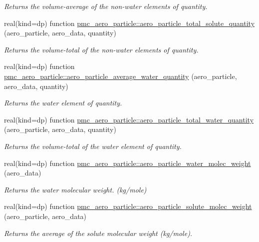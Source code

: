 \begin{DoxyCompactItemize}
\begin{DoxyCompactList}\small\item\em Returns the volume-\/average of the non-\/water elements of quantity. \end{DoxyCompactList}\item 
real(kind=dp) function \mbox{\hyperlink{namespacepmc__aero__particle_a203722f122db295d8077019ec20a1d65}{pmc\+\_\+aero\+\_\+particle\+::aero\+\_\+particle\+\_\+total\+\_\+solute\+\_\+quantity}} (aero\+\_\+particle, aero\+\_\+data, quantity)
\begin{DoxyCompactList}\small\item\em Returns the volume-\/total of the non-\/water elements of quantity. \end{DoxyCompactList}\item 
real(kind=dp) function \mbox{\hyperlink{namespacepmc__aero__particle_aecc8efd7dd11b637428dd173d847366c}{pmc\+\_\+aero\+\_\+particle\+::aero\+\_\+particle\+\_\+average\+\_\+water\+\_\+quantity}} (aero\+\_\+particle, aero\+\_\+data, quantity)
\begin{DoxyCompactList}\small\item\em Returns the water element of quantity. \end{DoxyCompactList}\item 
real(kind=dp) function \mbox{\hyperlink{namespacepmc__aero__particle_a472b1a90315a18d963f8f2f57bbc94fc}{pmc\+\_\+aero\+\_\+particle\+::aero\+\_\+particle\+\_\+total\+\_\+water\+\_\+quantity}} (aero\+\_\+particle, aero\+\_\+data, quantity)
\begin{DoxyCompactList}\small\item\em Returns the volume-\/total of the water element of quantity. \end{DoxyCompactList}\item 
real(kind=dp) function \mbox{\hyperlink{namespacepmc__aero__particle_a223d96eb6697ad6f4cd2b16074d0c9cf}{pmc\+\_\+aero\+\_\+particle\+::aero\+\_\+particle\+\_\+water\+\_\+molec\+\_\+weight}} (aero\+\_\+data)
\begin{DoxyCompactList}\small\item\em Returns the water molecular weight. (kg/mole) \end{DoxyCompactList}\item 
real(kind=dp) function \mbox{\hyperlink{namespacepmc__aero__particle_a8a9fb61df2366ea2e6e29ff3ed66ad04}{pmc\+\_\+aero\+\_\+particle\+::aero\+\_\+particle\+\_\+solute\+\_\+molec\+\_\+weight}} (aero\+\_\+particle, aero\+\_\+data)
\begin{DoxyCompactList}\small\item\em Returns the average of the solute molecular weight (kg/mole). \end{DoxyCompactList}\item 

\end{DoxyCompactItemize}
